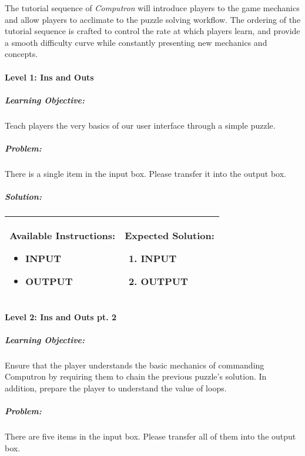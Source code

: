 The tutorial sequence of \textit{Computron} will introduce players to the game mechanics 
and allow players to acclimate to the puzzle solving workflow. The ordering of the tutorial 
sequence is crafted to control the rate at which players learn, and provide a smooth 
difficulty curve while constantly presenting new mechanics and concepts.\\

\paragraph{Level 1: Ins and Outs}
\subparagraph{Learning Objective:} Teach players the very basics of our user interface 
through a simple puzzle.

\subparagraph{Problem:} There is a single item in the input box. Please transfer it into 
the output box.

\subparagraph{Solution:} 
\begin{center}
    \begin{tabular}{ | m{5cm} | m{9cm} | } 
        \hline
            \textbf{Available Instructions:} 
            \begin{itemize}
                \setlength\itemsep{-.35em}
                \item INPUT
                \item OUTPUT
            \end{itemize}& 
            \textbf{Expected Solution:} 
            \begin{enumerate}
                \setlength\itemsep{-.35em}
                \item INPUT
                \item OUTPUT
            \end{enumerate}
            \\
        \hline
    \end{tabular}
\end{center}


\paragraph{Level 2: Ins and Outs pt. 2}
\subparagraph{Learning Objective:} Ensure that the player understands the basic 
mechanics of commanding Computron by requiring them to chain the previous 
puzzle's solution. In addition, prepare the player to understand the value of loops.

\subparagraph{Problem:} There are five items in the input box. Please transfer all 
of them into the output box.

